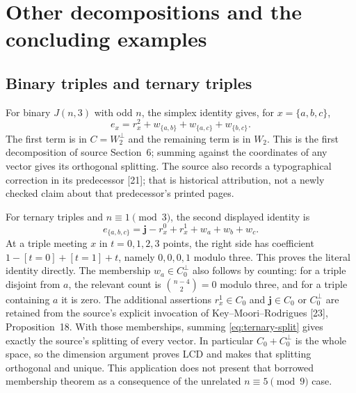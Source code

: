 \section{Other decompositions and the concluding examples}
\subsection{Binary triples and ternary triples}
For binary $J(n,3)$ with odd $n$, the simplex identity gives, for
$x=\{a,b,c\}$,
\[
 e_x=r_x^2+w_{\{a,b\}}+w_{\{a,c\}}+w_{\{b,c\}}.
\]
The first term is in $C=W_2^\perp$ and the remaining term is in $W_2$.
This is the first decomposition of source Section~6; summing against
the coordinates of any vector gives its orthogonal splitting. The
source also records a typographical correction in its predecessor [21];
that is historical attribution, not a newly checked claim about that
predecessor's printed pages.

For ternary triples and $n\equiv1\pmod3$, the second displayed identity is
\begin{equation}\label{eq:ternary-split}
 e_{\{a,b,c\}}=\mathbf j-r_x^0+r_x^1+w_a+w_b+w_c.
\end{equation}
At a triple meeting $x$ in $t=0,1,2,3$ points, the right side has
coefficient $1-[t=0]+[t=1]+t$, namely $0,0,0,1$ modulo three.
This proves the literal identity directly. The membership
$w_a\in C_0^\perp$ also follows by counting: for a triple disjoint
from $a$, the relevant count is $\binom{n-4}{2}=0$ modulo three,
and for a triple containing $a$ it is zero. The additional assertions
$r_x^1\in C_0$ and $\mathbf j\in C_0$ or $C_0^\perp$ are retained
from the source's explicit invocation of Key--Moori--Rodrigues [23],
Proposition~18. With those memberships, summing
\eqref{eq:ternary-split} gives exactly the source's splitting of every
vector. In particular $C_0+C_0^\perp$ is the whole space, so the
dimension argument proves LCD and makes that splitting orthogonal and
unique. This application does not present that borrowed membership
theorem as a consequence of the unrelated $n\equiv5\pmod9$ case.

